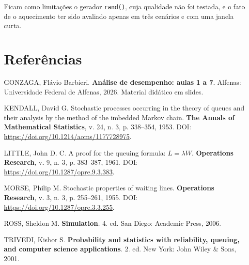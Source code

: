 \documentclass[
  article,      %
  10pt,         %
  oneside,
  a4paper,
  twocolumn,    %
  english,
  brazil        %
]{abntex2}
\begin{document}
Ficam como limitações o gerador \texttt{rand()}, cuja qualidade não foi testada, e o fato de o aquecimento ter sido avaliado apenas em três cenários e com uma janela curta.


\section*{Referências}

\begin{SingleSpace}
\raggedright
\noindent
GONZAGA, Flávio Barbieri. \textbf{Análise de desempenho: aulas 1 a 7}.
Alfenas: Universidade Federal de Alfenas, 2026. Material didático em slides.

\vspace{0.4em}
\noindent
KENDALL, David G. Stochastic processes occurring in the theory of queues and
their analysis by the method of the imbedded Markov chain. \textbf{The Annals
of Mathematical Statistics}, v. 24, n. 3, p. 338--354, 1953. DOI:
\url{https://doi.org/10.1214/aoms/1177728975}.

\vspace{0.4em}
\noindent
LITTLE, John D. C. A proof for the queuing formula: $L=\lambda W$.
\textbf{Operations Research}, v. 9, n. 3, p. 383--387, 1961. DOI:
\url{https://doi.org/10.1287/opre.9.3.383}.

\vspace{0.4em}
\noindent
MORSE, Philip M. Stochastic properties of waiting lines.
\textbf{Operations Research}, v. 3, n. 3, p. 255--261, 1955. DOI:
\url{https://doi.org/10.1287/opre.3.3.255}.

\vspace{0.4em}
\noindent
ROSS, Sheldon M. \textbf{Simulation}. 4. ed. San Diego: Academic Press, 2006.

\vspace{0.4em}
\noindent
TRIVEDI, Kishor S. \textbf{Probability and statistics with reliability,
queuing, and computer science applications}. 2. ed. New York: John Wiley
\& Sons, 2001.
\end{SingleSpace}
\end{document}

